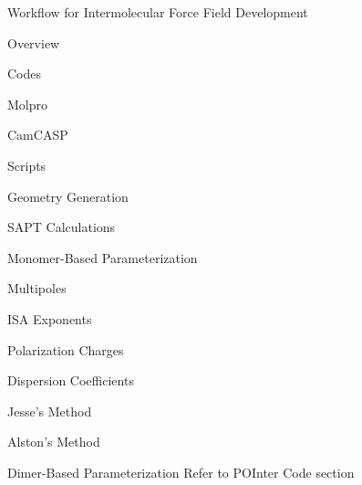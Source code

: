 \begin{chapter}{Workflow for Intermolecular Force Field Development}

\begin{section}{Overview}
\end{section}


\begin{section}{Codes}
\begin{subsection}{Molpro}
\end{subsection}
\begin{subsection}{CamCASP}
\end{subsection}
\begin{subsection}{Scripts}
\end{subsection}
\end{section}

\begin{section}{Geometry Generation}
\end{section}

\begin{section}{SAPT Calculations}
\end{section}


\begin{section}{Monomer-Based Parameterization}
\begin{subsection}{Multipoles}
\end{subsection}
\begin{subsection}{ISA Exponents}
\end{subsection}
\begin{subsection}{Polarization Charges}
\end{subsection}
\begin{subsection}{Dispersion Coefficients}
\begin{subsubsection}{Jesse's Method}
\end{subsubsection}
\begin{subsubsection}{Alston's Method}
\end{subsubsection}
\end{subsection}
\end{section}

\begin{section}{Dimer-Based Parameterization}
Refer to POInter Code section
\end{section}

\end{chapter}
